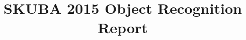 \documentclass[10pt,a4paper]{llncs}
\begin{document}
\title{SKUBA 2015 Object Recognition Report}
\author{ }
\institute{ }
\maketitle


\end{document}
